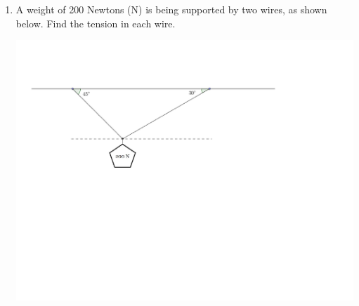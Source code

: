 \documentclass[12pt]{article}
\newif\ifans
\begin{document}
\begin{enumerate}
\ifans{\fbox{\parbox{1\linewidth}{(a) The magnitude is $20\sqrt{5}$ lb at an angle of $\pi-\tan^{-1}\left(\frac{1}{2}\right)$ radians counterclockwise with the positive $x$ axis.\\
\\
(b) The magnitude is $150\sqrt{10}$ N at an angle of $\tan^{-1}\left(\frac{1}{2}\right)$ radians counterclockwise with the positive $x$ axis.}}} \fi

\newpage

\item A weight of 200 Newtons (N) is being supported by two wires, as shown below.  Find the tension in each wire.
\begin{center}
\includegraphics[scale=0.6]{vector6.pdf}
\end{center}

\ifans{\fbox{\parbox{1\linewidth}{Let $F_1$ be the wire which  makes an angle of $45^{\circ}$ clockwise with the ceiling and $F_2$ be the wire which  makes an angle of $30^{\circ}$ counterclockwise with the ceiling.  Then $\|F_2\|=\frac{400}{1+\sqrt{3}}$ N and $\|F_1\|=\frac{\sqrt{3}}{\sqrt{2}}\cdot\frac{400}{1+\sqrt{3}}$ N.}}} \fi

\end{enumerate}
\end{document}
